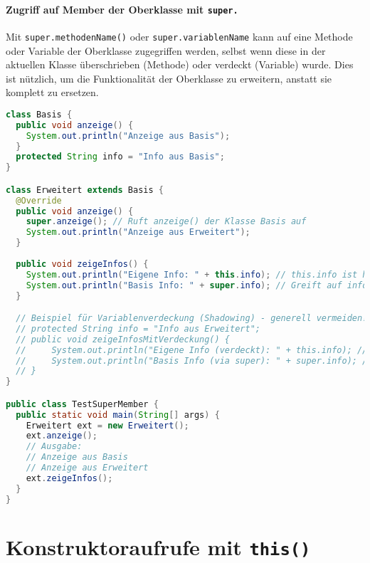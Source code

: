 \paragraph{Zugriff auf Member der Oberklasse mit \texttt{super.}}
Mit \texttt{super.methodenName()} oder \texttt{super.variablenName} kann auf eine Methode oder Variable der Oberklasse zugegriffen werden, 
selbst wenn diese in der aktuellen Klasse überschrieben (Methode) oder verdeckt (Variable) wurde. Dies ist nützlich, um die Funktionalität 
der Oberklasse zu erweitern, anstatt sie komplett zu ersetzen.

\begin{lstlisting}[language=Java, caption={Zugriff auf überschriebene Methode der Oberklasse via \texttt{super.}}]
class Basis {
  public void anzeige() {
    System.out.println("Anzeige aus Basis");
  }
  protected String info = "Info aus Basis";
}

class Erweitert extends Basis {
  @Override
  public void anzeige() {
    super.anzeige(); // Ruft anzeige() der Klasse Basis auf
    System.out.println("Anzeige aus Erweitert");
  }
    
  public void zeigeInfos() {
    System.out.println("Eigene Info: " + this.info); // this.info ist hier redundant, da info nicht neu deklariert wurde
    System.out.println("Basis Info: " + super.info); // Greift auf info der Basisklasse zu
  }

  // Beispiel für Variablenverdeckung (Shadowing) - generell vermeiden!
  // protected String info = "Info aus Erweitert"; 
  // public void zeigeInfosMitVerdeckung() {
  //     System.out.println("Eigene Info (verdeckt): " + this.info); // Info aus Erweitert
  //     System.out.println("Basis Info (via super): " + super.info); // Info aus Basis
  // }
}

public class TestSuperMember {
  public static void main(String[] args) {
    Erweitert ext = new Erweitert();
    ext.anzeige();
    // Ausgabe:
    // Anzeige aus Basis
    // Anzeige aus Erweitert
    ext.zeigeInfos();
  }
}
\end{lstlisting}


\section{Konstruktoraufrufe mit \texttt{this()}}
\label{sec:this_konstruktor}

